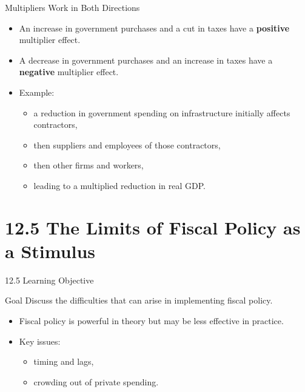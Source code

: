 \documentclass[aspectratio=169]{beamer}
\begin{document}
\begin{frame}{Multipliers Work in Both Directions}
\transfade
\begin{itemize}
  \item An \alert{increase} in government purchases and a \alert{cut} in taxes have a \textbf{positive} multiplier effect.
  \item A \alert{decrease} in government purchases and an \alert{increase} in taxes have a \textbf{negative} multiplier effect.
  \item Example:
  \begin{itemize}
    \item a reduction in government spending on infrastructure initially affects contractors,
    \item then suppliers and employees of those contractors,
    \item then other firms and workers,
    \item leading to a multiplied reduction in real GDP.
  \end{itemize}
\end{itemize}
\end{frame}

\section{12.5 The Limits of Fiscal Policy as a Stimulus}

\begin{frame}{12.5 Learning Objective}
\transfade
\begin{block}{Goal}
Discuss the difficulties that can arise in implementing fiscal policy.
\end{block}
\begin{itemize}
  \item Fiscal policy is powerful in theory but may be less effective in practice.
  \item Key issues:
  \begin{itemize}
    \item timing and lags,
    \item crowding out of private spending.
  \end{itemize}
\end{itemize}
\end{frame}
\end{document}
